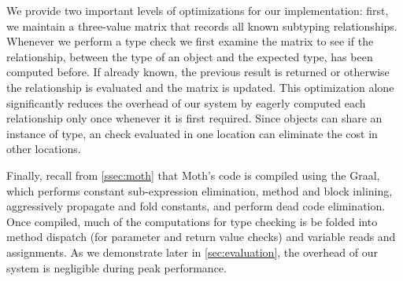 We provide two important levels of optimizations for our implementation: 
first, we maintain a three-value matrix that records all known subtyping relationships. 
Whenever we perform a type check we first examine the matrix to see if the relationship, 
between the type of an object and the expected type, has been computed before.
If already known, the previous result is returned 
or otherwise the relationship is evaluated and the matrix is updated.
This optimization alone significantly reduces the overhead of our system 
by eagerly computed each relationship only once whenever it is first required. 
Since objects can share an instance of type,
an check evaluated in one location can eliminate the cost in other locations.

Finally, recall from \cref{ssec:moth} that
Moth's code is compiled using the Graal, 
which performs
constant sub-expression elimination,
method and block inlining,
aggressively propagate and fold constants, and
perform dead code elimination.
Once compiled, much of the computations for type checking
is be folded into method dispatch
(for parameter and return value checks)
and variable reads and assignments.
As we demonstrate later in \cref{sec:evaluation}, 
the overhead of our system is negligible during peak performance.
